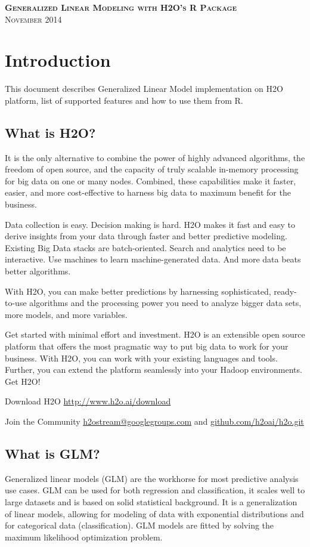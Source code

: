 \documentclass[11pt]{article}
\begin{document}
\thispagestyle{empty} %

\begin{center}
\textsc{\Large\bf{Generalized Linear Modeling  with H2O's R Package}}
\\
\bigskip
\textsc{November 2014}
\end{center}
\bigskip
\bigskip 
\bigskip
\bigskip
\tableofcontents

\newpage

\section{Introduction} \label{1}
This document describes Generalized Linear Model implementation on H2O platform, list of supported features and how to use them from R. 

\subsection{What is H2O?}
It is the only alternative to combine the power of highly advanced algorithms, the freedom of open source, and the capacity of truly scalable in-memory processing for big data on one or many nodes. Combined, these capabilities make it faster, easier, and more cost-effective to harness big data to maximum benefit for the business. 

Data collection is easy. Decision making is hard. H2O makes it fast and easy to derive insights from your data through faster and better predictive modeling. Existing Big Data stacks are batch-oriented. Search and analytics need to be interactive. Use machines to learn machine-generated data. And more data beats better algorithms. 

With H2O, you can make better predictions by harnessing sophisticated, ready-to-use algorithms and the processing power you need to analyze bigger data sets, more models, and more variables. 

Get started with minimal effort and investment. H2O is an extensible open source platform that offers the most pragmatic way to put big data to work for your business. With H2O, you can work with your existing languages and tools. Further, you can extend the platform seamlessly into your Hadoop environments. Get H2O!

Download H2O
\url{http://www.h2o.ai/download}

Join the Community
\url{h2ostream@googlegroups.com} and \url{github.com/h2oai/h2o.git}

\subsection{What is GLM?}
Generalized linear models (GLM) are the workhorse for most predictive analysis use cases. GLM can be used for both regression and classification, it scales well to large datasets and is based on solid statistical background. It is a generalization of linear models, allowing for modeling of data with exponential distributions and for categorical data (classification). GLM models are fitted by solving the maximum likelihood optimization problem.
\end{document}
